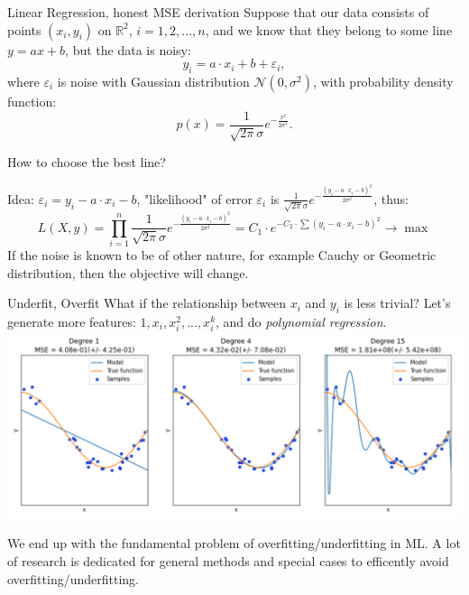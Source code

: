 \documentclass{beamer}
\theoremstyle{remark}
\begin{document}
\begin{frame}{Linear Regression, honest MSE derivation}
    Suppose that our data consists of points $(x_i, y_i)$ on $\mathbb{R}^2$, $i = 1,  2, ..., n$, and we know that they belong to some line $y = ax + b$, but the data is noisy: $$y_i = a\cdot x_i + b + \varepsilon_i,$$ where $\varepsilon_i$ is noise with Gaussian distribution $\mathcal{N}(0, \sigma^2)$, with probability density function: $$p(x) = \frac{1}{\sqrt{2\pi}\sigma}e^{-\frac{x^2}{2\sigma^2}}.$$
    
    How to choose the best line?\vspace{0.1in}
    
    Idea: $\varepsilon_i = y_i - a\cdot x_i - b$, "likelihood" of error $\varepsilon_i$ is $\frac{1}{\sqrt{2\pi}\sigma}e^{-\frac{(y_i - a\cdot x_i - b)^2}{2\sigma^2}}$, thus:
    $$L(X, y) = \prod\limits_{i=1}^{n}\frac{1}{\sqrt{2\pi}\sigma}e^{-\frac{(y_i - a\cdot x_i - b)^2}{2\sigma^2}} = C_1 \cdot e^{-C_2 \cdot \sum (y_i - a\cdot x_i - b)^2} \to \max$$
    If the noise is known to be of other nature, for example Cauchy or Geometric distribution, then the objective will change.
\end{frame}

\begin{frame}{Underfit, Overfit}
    What if the relationship between $x_i$ and $y_i$ is less trivial? Let's generate more features: $1, x_i, x_i^2, ..., x_i^k$, and do \textit{polynomial regression}.
    \includegraphics[width=\textwidth]{pictures/underfitting.png}
    
    We end up with the fundamental problem of overfitting/underfitting in ML. A lot of research is dedicated for general methods and special cases to efficently avoid overfitting/underfitting.
\end{frame}
\end{document}
